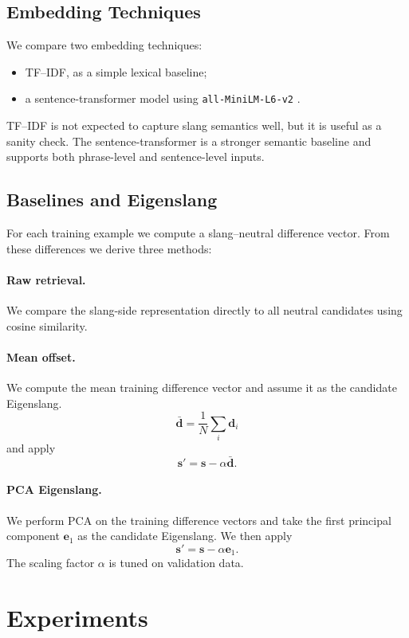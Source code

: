 \documentclass{article}
\begin{document}
\subsection{Embedding Techniques}
We compare two embedding techniques:
\begin{itemize}
\item TF--IDF, as a simple lexical baseline;
\item a sentence-transformer model using \texttt{all-MiniLM-L6-v2} \citep{reimers2019sentence}.
\end{itemize}

TF--IDF is not expected to capture slang semantics well, but it is useful as a sanity check.
The sentence-transformer is a stronger semantic baseline and supports both phrase-level and sentence-level inputs.

\subsection{Baselines and Eigenslang}
For each training example we compute a slang--neutral difference vector.
From these differences we derive three methods:

\paragraph{Raw retrieval.}
We compare the slang-side representation directly to all neutral candidates using cosine similarity.

\paragraph{Mean offset.}
We compute the mean training difference vector and assume it as the candidate Eigenslang.
\[
\bar{\mathbf{d}} = \frac{1}{N} \sum_i \mathbf{d}_i
\]
and apply
\[
\mathbf{s}' = \mathbf{s} - \alpha \bar{\mathbf{d}}.
\]

\paragraph{PCA Eigenslang.}
We perform PCA on the training difference vectors and take the first principal component $\mathbf{e}_1$ as the candidate Eigenslang.
We then apply
\[
\mathbf{s}' = \mathbf{s} - \alpha \mathbf{e}_1.
\]
The scaling factor $\alpha$ is tuned on validation data.

\section{Experiments}
\end{document}
